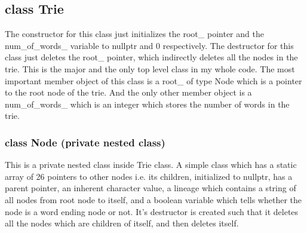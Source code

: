 \subsection{{\color{orange}class} {\Large{\color{draculapurple}Trie}}}
The {\color{draculapurple}constructor} for this class just initializes the {\color{draculapurple}root\_} pointer and the {\color{draculapurple}num\_of\_words\_} variable to 
{\color{draculapurple}nullptr} and {\color{draculapurple}0} respectively. The {\color{draculapurple}destructor} for this class just deletes the {\color{draculapurple}root\_} pointer, which indirectly deletes all the nodes in the trie.
This is the major and the only top level class in my whole code. The most important member object of this class is a {\color{draculapurple}root\_} of 
type {\color{draculapurple}Node} which is a pointer to the root node of the trie. And the only other member object is a {\color{draculapurple}num\_of\_words\_} 
which is an integer which stores the number of words in the trie.

\subsubsection{{\color{orange}class} {\color{draculapurple}Node} (private nested class)}
This is a private nested class inside {\color{draculapurple}Trie} class. A simple class which has a static array of 26 pointers to other nodes i.e. its {\color{Turquoise}children}, initialized to nullptr, has a {\color{Turquoise}parent} pointer, 
an inherent {\color{Turquoise}character value}, a {\color{Turquoise}lineage} which contains a string of all nodes from root node to itself, and a boolean variable which 
tells whether the node is a {\color{Turquoise}word ending} node or not.
It's {\color{draculapurple}destructor} is created such that it deletes all the nodes which are children of itself, and then deletes itself.

